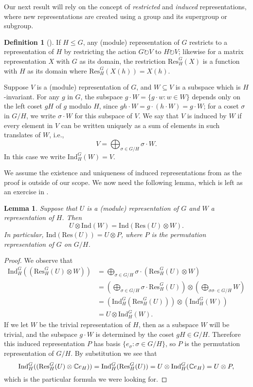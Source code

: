 \documentclass[12pt,twoside]{reedthesis}
\theoremstyle{plain}   %
\newtheorem{lemma}{Lemma}[section]
\theoremstyle{definition}
\newtheorem{defn}{Definition}[section]
\theoremstyle{remark}
\numberwithin{equation}{section}
\def\ind{\mathrm{Ind}}
\def\res{\mathrm{Res}}
\def\acts{\circlearrowright} %
\begin{document}
  Our next result will rely on the concept of \emph{restricted} and \emph{induced} representations, where new representations are created using a group and its supergroup or subgroup.
  \begin{defn}[{\cite[Section 3.3]{fulton2004}}]
    If $H \leq G$, any (module) representation of $G$ restricts to a representation of $H$ by restricting the action $G \acts V$ to $H \acts V$; likewise for a matrix representation $X$ with $G$ as its domain,
    the restriction $\res_H^G (X)$ is a function with $H$ as its domain where $\res_H^G(X(h)) = X(h)$.
    \par
    Suppose $V$ is a (module) representation of $G$, and $W \subseteq V$ is a subspace which is $H$-invariant.
    For any $g$ in $G$, the subspace $g \cdot W = \{ g \cdot w: w \in W\}$ depends only on the left coset $gH$ of $g$ modulo $H$, since $gh \cdot W = g \cdot (h \cdot W) = g \cdot W$;
    for a coset $\sigma$ in $G/H$, we write $\sigma \cdot W$ for this subspace of $V$. We say that $V$ is induced by $W$ if every element in $V$ can be written uniquely as a sum of elements in such translates of $W$, i.e.,
    \[ V = \bigoplus_{\sigma \in G/H} \sigma \cdot W.\]
    In this case we write $\ind^G_H (W) = V$.
  \end{defn}
  We assume the existence and uniqueness of induced representations from \cite[Example 3.14, Example 3.15]{fulton2004} as the proof is outside of our scope.
  We now need the following lemma, which is left as an exercise in \cite[Exercise 3.16]{fulton2004}.
  \begin{lemma}
    Suppose that $U$ is a (module) representation of $G$ and $W$ a representation of $H$. Then
    \[ U \otimes \ind (W) = \ind( \res (U) \otimes W).\]
    In particular, $\ind ( \res (U)) = U \otimes P$, where $P$ is the permutation representation of $G$ on $G/H$.
  \end{lemma}
  \begin{proof}
    We observe that
    \begin{align*}
      \ind^G_H ((\res^G_H(U) \otimes W)) &= \bigoplus_{\sigma \in G/H} \sigma \cdot ( \res^G_H(U) \otimes W) \\
                                       &= (\bigoplus_{\sigma \in G/H}  \sigma \cdot \res^G_H(U)) \otimes ( \bigoplus_{\sigma \sigma \cdot \in G/H} W) \\
                                       &= ( \ind^G_H (\res^G_H(U))) \otimes ( \ind^G_H ( W)) \\
                                       &= U \otimes \ind^G_H (W).
    \end{align*}
    If we let $W$ be the trivial representation of $H$, then as a subspace $W$ will be trivial, and the subspace $g \cdot W$ is determined by the coset $gH \in G/H$. Therefore
    this induced representation $P$ has basis $\{e_\sigma : \sigma \in G/H\}$,
    so $P$ is the permutation representation of $G/H$.
    By substitution we see that
    \[ \ind^G_H ((\res^G_H(U) \otimes \CC e_H)) =  \ind^G_H (\res^G_H(U)) = U \otimes \ind^G_H (\CC e_H) = U \otimes P,\]
    which is the particular formula we were looking for.
  \end{proof}
\end{document}
